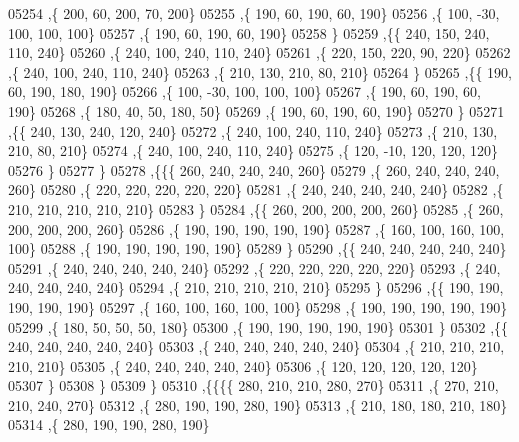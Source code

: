 \begin{DoxyCode}
05254     ,\{   200,    60,   200,    70,   200\}
05255     ,\{   190,    60,   190,    60,   190\}
05256     ,\{   100,   -30,   100,   100,   100\}
05257     ,\{   190,    60,   190,    60,   190\}
05258     \}
05259    ,\{\{   240,   150,   240,   110,   240\}
05260     ,\{   240,   100,   240,   110,   240\}
05261     ,\{   220,   150,   220,    90,   220\}
05262     ,\{   240,   100,   240,   110,   240\}
05263     ,\{   210,   130,   210,    80,   210\}
05264     \}
05265    ,\{\{   190,    60,   190,   180,   190\}
05266     ,\{   100,   -30,   100,   100,   100\}
05267     ,\{   190,    60,   190,    60,   190\}
05268     ,\{   180,    40,    50,   180,    50\}
05269     ,\{   190,    60,   190,    60,   190\}
05270     \}
05271    ,\{\{   240,   130,   240,   120,   240\}
05272     ,\{   240,   100,   240,   110,   240\}
05273     ,\{   210,   130,   210,    80,   210\}
05274     ,\{   240,   100,   240,   110,   240\}
05275     ,\{   120,   -10,   120,   120,   120\}
05276     \}
05277    \}
05278   ,\{\{\{   260,   240,   240,   240,   260\}
05279     ,\{   260,   240,   240,   240,   260\}
05280     ,\{   220,   220,   220,   220,   220\}
05281     ,\{   240,   240,   240,   240,   240\}
05282     ,\{   210,   210,   210,   210,   210\}
05283     \}
05284    ,\{\{   260,   200,   200,   200,   260\}
05285     ,\{   260,   200,   200,   200,   260\}
05286     ,\{   190,   190,   190,   190,   190\}
05287     ,\{   160,   100,   160,   100,   100\}
05288     ,\{   190,   190,   190,   190,   190\}
05289     \}
05290    ,\{\{   240,   240,   240,   240,   240\}
05291     ,\{   240,   240,   240,   240,   240\}
05292     ,\{   220,   220,   220,   220,   220\}
05293     ,\{   240,   240,   240,   240,   240\}
05294     ,\{   210,   210,   210,   210,   210\}
05295     \}
05296    ,\{\{   190,   190,   190,   190,   190\}
05297     ,\{   160,   100,   160,   100,   100\}
05298     ,\{   190,   190,   190,   190,   190\}
05299     ,\{   180,    50,    50,    50,   180\}
05300     ,\{   190,   190,   190,   190,   190\}
05301     \}
05302    ,\{\{   240,   240,   240,   240,   240\}
05303     ,\{   240,   240,   240,   240,   240\}
05304     ,\{   210,   210,   210,   210,   210\}
05305     ,\{   240,   240,   240,   240,   240\}
05306     ,\{   120,   120,   120,   120,   120\}
05307     \}
05308    \}
05309   \}
05310  ,\{\{\{\{   280,   210,   210,   280,   270\}
05311     ,\{   270,   210,   210,   240,   270\}
05312     ,\{   280,   190,   190,   280,   190\}
05313     ,\{   210,   180,   180,   210,   180\}
05314     ,\{   280,   190,   190,   280,   190\}

\end{DoxyCode}
